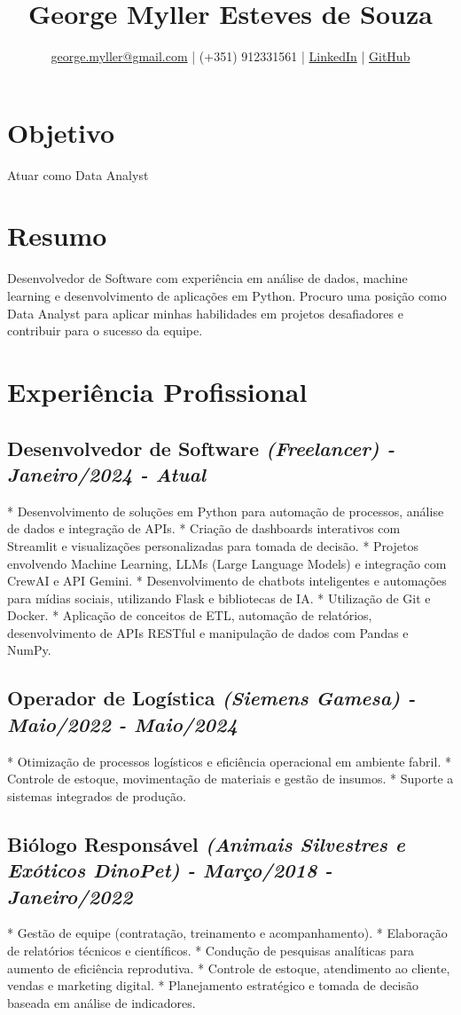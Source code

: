 \documentclass{article}
\title{George Myller Esteves de Souza}
\author{\href{mailto:george.myller@gmail.com}{george.myller@gmail.com} | (+351) 912331561 | \href{https://linkedin.com/in/george-m-souza}{LinkedIn} | \href{https://github.com/GeorgeMyller}{GitHub}}
\date{}
\begin{document}
\maketitle

\section*{Objetivo}
 Atuar como Data Analyst

\section*{Resumo}
Desenvolvedor de Software com experiência em análise de dados, machine learning e desenvolvimento de aplicações em Python. Procuro uma posição como Data Analyst para aplicar minhas habilidades em projetos desafiadores e contribuir para o sucesso da equipe.

\section*{Experiência Profissional}
\subsection*{Desenvolvedor de Software \textit{(Freelancer) - Janeiro/2024 - Atual}}
* Desenvolvimento de soluções em Python para automação de processos, análise de dados e integração de APIs.
* Criação de dashboards interativos com Streamlit e visualizações personalizadas para tomada de decisão.
* Projetos envolvendo Machine Learning, LLMs (Large Language Models) e integração com CrewAI e API Gemini.
* Desenvolvimento de chatbots inteligentes e automações para mídias sociais, utilizando Flask e bibliotecas de IA.
* Utilização de Git e Docker.
* Aplicação de conceitos de ETL, automação de relatórios, desenvolvimento de APIs RESTful e manipulação de dados com Pandas e NumPy.

\subsection*{Operador de Logística \textit{(Siemens Gamesa) - Maio/2022 - Maio/2024}}
* Otimização de processos logísticos e eficiência operacional em ambiente fabril.
* Controle de estoque, movimentação de materiais e gestão de insumos.
* Suporte a sistemas integrados de produção.

\subsection*{Biólogo Responsável \textit{(Animais Silvestres e Exóticos DinoPet) - Março/2018 - Janeiro/2022}}
* Gestão de equipe (contratação, treinamento e acompanhamento).
* Elaboração de relatórios técnicos e científicos.
* Condução de pesquisas analíticas para aumento de eficiência reprodutiva.
* Controle de estoque, atendimento ao cliente, vendas e marketing digital.
* Planejamento estratégico e tomada de decisão baseada em análise de indicadores.
\end{document}
